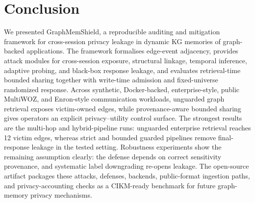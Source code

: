 \documentclass[journal,10pt,twocolumn]{IEEEtran}
\begin{document}
\section{Conclusion}
\label{sec:conclusion}
We presented GraphMemShield, a reproducible auditing and mitigation
framework for cross-session privacy leakage in dynamic KG memories
of graph-backed applications. The framework formalises edge-event
adjacency, provides attack modules for cross-session exposure,
structural linkage, temporal inference, adaptive probing, and
black-box response leakage, and evaluates retrieval-time bounded
sharing together with write-time admission and fixed-universe
randomized response. Across synthetic, Docker-backed,
enterprise-style, public MultiWOZ, and Enron-style communication
workloads, unguarded graph
retrieval exposes victim-owned edges, while provenance-aware bounded
sharing gives operators an explicit privacy--utility control surface.
The strongest results are the multi-hop and hybrid-pipeline runs:
unguarded enterprise retrieval reaches 12 victim edges, whereas
strict and bounded guarded pipelines remove final-response leakage in
the tested setting. Robustness experiments show the remaining
assumption clearly: the defense depends on correct sensitivity
provenance, and systematic label downgrading re-opens leakage. The
open-source artifact packages these attacks, defenses, backends,
public-format ingestion paths, and privacy-accounting checks as a
CIKM-ready benchmark for future graph-memory privacy mechanisms.



\end{document}
